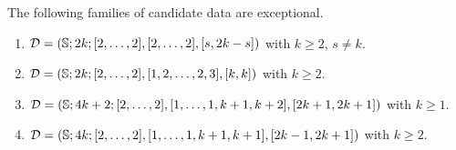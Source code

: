\begin{proposition}\label{short-partition:th:exceptional-sphere}
The following families of candidate data are exceptional.
\begin{enumerate}[(1)]
\item $\mathcal{D}=(\mathbb{S}{};2k;[2,\ldots,2],[2,\ldots,2],[s,2k-s])$ with $k\ge 2$, $s\neq k$.
\item $\mathcal{D}=(\mathbb{S}{};2k;[2,\ldots,2],[1,2,\ldots,2,3],[k,k])$ with $k\ge2$.
\item $\mathcal{D}=(\mathbb{S}{};4k+2;[2,\ldots,2],[1,\ldots,1,k+1,k+2],[2k+1,2k+1])$ with $k\ge 1$.
\item $\mathcal{D}=(\mathbb{S}{};4k;[2,\ldots,2],[1,\ldots,1,k+1,k+1],[2k-1,2k+1])$ with $k\ge2$.
\end{enumerate}
\end{proposition}
